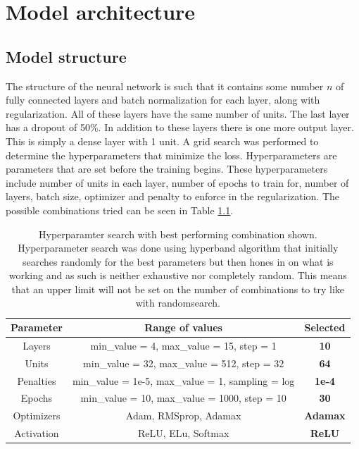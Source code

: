 
\chapter{Model architecture} %

\label{Chapter4} %


\section{Model structure}
The structure of the neural network is such that it contains some number $n$ of fully connected layers and batch normalization for each layer, along with regularization. All of these layers have the same number of units. The last layer has a dropout of 50\%. In addition to these layers there is one more output layer. This is simply a dense layer with 1 unit. A grid search was performed to determine the hyperparameters that minimize the loss. Hyperparameters are parameters that are set before the training begins\cite{hyperparameters_definition}. These hyperparameters include number of units in each layer, number of epochs to train for, number of layers, batch size, optimizer and penalty to enforce in the regularization. The possible combinations tried can be seen in Table \ref{table:gridSearchHyperparamters}.

\begin{table}[h]
    \centering
    \caption[Hyperparamter search with best performing combination.]{Hyperparamter search with best performing combination shown. Hyperparameter search was done using hyperband algorithm that initially searches randomly for the best parameters but then hones in on what is working and as such is neither exhaustive nor completely random. This means that an upper limit will not be set on the number of combinations to try like with randomsearch.}
    \label{table:gridSearchHyperparamters}
    \begin{tabular}{c|c|c}
        Parameter & Range of values & Selected\\\hline
        Layers &  min\_value = 4, max\_value = 15, step = 1 & \textbf{10}\\\hline
        Units &  min\_value = 32, max\_value = 512, step = 32 & \textbf{64}\\\hline
        Penalties & min\_value = 1e-5, max\_value = 1, sampling = log & \textbf{1e-4}\\\hline
        Epochs & min\_value = 10, max\_value = 1000, step = 10 & \textbf{30}\\\hline
        Optimizers & Adam, RMSprop, Adamax & \textbf{Adamax}\\\hline
        Activation & ReLU, ELu, Softmax & \textbf{ReLU}\\\hline
    \end{tabular}
\end{table}

